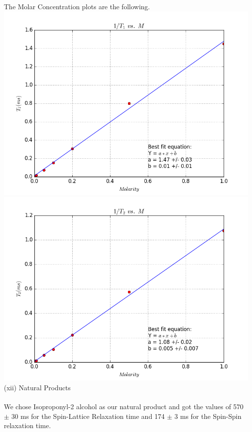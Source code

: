 \documentclass{article}
\begin{document}
{\begin{multicols}{2}
\label{fig:33}
\justify
The Molar Concentration plots are the following.
\includegraphics[width=\linewidth]{pic-for-report/t1-molar.png}
\label{fig:34}
\includegraphics[width=\linewidth]{pic-for-report/t2-molar.png}
\label{fig:35}
\justify
(xii) Natural Products \\
\\
We chose Isoproponyl-2 alcohol as our natural product and got the values of 
570 $\pm$ 30 ms for the Spin-Lattice Relaxation time and 174 $\pm$ 3 ms for the Spin-Spin relaxation time.

\end{multicols}}
\end{document}
